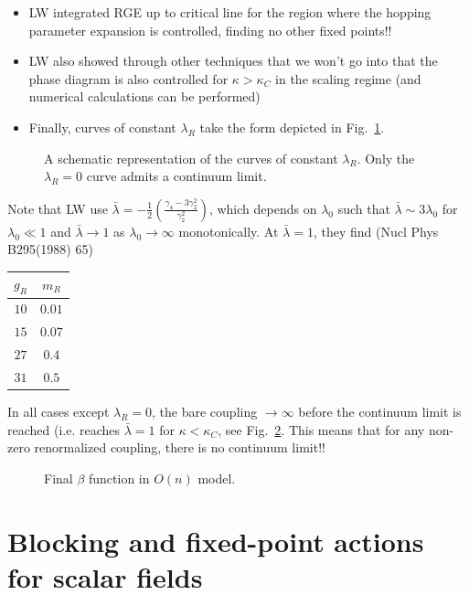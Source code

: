 \begin{itemize}
    \item LW integrated RGE up to critical line for the region where the hopping parameter expansion is controlled, finding no other fixed points!!
    \item LW also showed through other techniques that we won't go into that the phase diagram is also controlled for $\kappa > \kappa_C$ in the scaling regime (and numerical calculations can be performed)
    \item Finally, curves of constant $\lambda_R$ take the form depicted in Fig.~\ref{fig:lam0_curves}. 
\end{itemize}
\begin{figure}
    \centering
    \caption{A schematic representation of the curves of constant $\lambda_R$. Only the $\lambda_R = 0$ curve admits a continuum limit.}
    \label{fig:lam0_curves}
\end{figure}

Note that LW use $\bar{\lambda} = - \frac{1}{2} \left(\frac{\gamma_4 - 3 \gamma_2^2}{\gamma_2^2}\right)$, which depends on $\lambda_0$ such that $\bar{\lambda} \sim 3 \lambda_0$ for $\lambda_0 \ll 1$ and $\bar{\lambda} \rightarrow 1$ as $\lambda_0 \rightarrow \infty$ monotonically. At $\bar{\lambda} = 1$, they find (Nucl Phys B295(1988) 65)

\begin{table}[h]
\centering
\begin{tabular}{c|c}
    $g_R$ & $m_R$ \\
    \hline
    $10$ & $0.01$ \\
    $15$ & $0.07$ \\
    $27$ & $0.4$ \\
    $31$ & $0.5$
\end{tabular}
\end{table}
In all cases except $\lambda_R = 0$, the bare coupling $\rightarrow \infty$ before the continuum limit is reached (i.e. reaches $\bar{\lambda} = 1$ for $\kappa < \kappa_C$, see Fig.~\ref{fig:On_beta_func_final}. This means that for any non-zero renormalized coupling, there is no continuum limit!!
\begin{figure}
    \centering
    \caption{Final $\beta$ function in $O(n)$ model.
    \label{fig:On_beta_func_final}}
\end{figure}



\section{Blocking and fixed-point actions for scalar fields}

